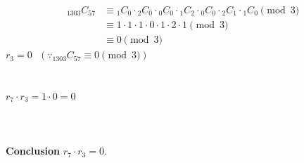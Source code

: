\documentclass{article}
\begin{document}
\begin{align*}
    {}_{1303}C_{57}
    &\equiv {}_{1}C_{0}\cdot{}_{2}C_{0}\cdot{}_{0}C_{0}\cdot{}_{1}C_{2}\cdot{}_{0}C_{0}\cdot{}_{2}C_{1}\cdot{}_{1}C_{0} \pmod{3} \\
    &\equiv 1\cdot1\cdot1\cdot0\cdot1\cdot2\cdot1 \pmod{3} \\
    &\equiv 0 \pmod{3}
\end{align*}
$r_3=0 \text{ }(\because {}_{1303}C_{57} \equiv0 \pmod{3})$ \\
\\\\
$r_7 \cdot r_3=1\cdot0=0$
\\\\
\\\\
\textbf{Conclusion} $r_7 \cdot r_3=\boxed{0}$.
\end{document}
